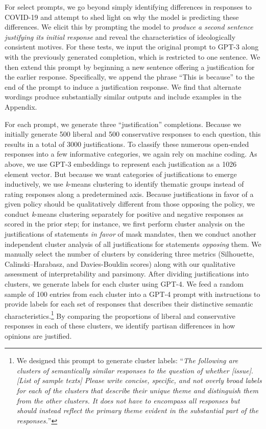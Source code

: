 \documentclass{article}
\begin{document}
For select prompts, we go beyond simply identifying differences in
responses to COVID-19 and attempt to shed light on why the model is
predicting these differences. We elicit this by prompting the model to
\emph{produce a second sentence justifying its initial response} and
reveal the characteristics of ideologically consistent motives. For
these tests, we input the original prompt to GPT-3 along with the
previously generated completion, which is restricted to one sentence. We
then extend this prompt by beginning a new sentence offering a
justification for the earlier response. Specifically, we append the
phrase ``This is because'' to the end of the prompt to induce a
justification response. We find that alternate wordings produce
substantially similar outputs and include examples in the Appendix.

For each prompt, we generate three ``justification'' completions.
Because we initially generate 500 liberal and 500 conservative responses
to each question, this results in a total of 3000 justifications. To
classify these numerous open-ended responses into a few informative
categories, we again rely on machine coding. As above, we use GPT-3
embeddings to represent each justification as a 1026 element vector. But
because we want categories of justifications to emerge inductively, we
use \emph{k}-means clustering to identify thematic groups instead of
rating responses along a predetermined axis. Because justifications in
favor of a given policy should be qualitatively different from those
opposing the policy, we conduct \emph{k}-means clustering separately for
positive and negative responses as scored in the prior step; for
instance, we first perform cluster analysis on the justifications of
statements \emph{in favor} of mask mandates, then we conduct another
independent cluster analysis of all justifications for statements
\emph{opposing} them. We manually select the number of clusters by
considering three metrics (Silhouette, Calinski--Harabasz, and
Davies-Bouldin scores) along with our qualitative assessment of
interpretability and parsimony. After dividing justifications into
clusters, we generate labels for each cluster using GPT-4. We feed a
random sample of 100 entries from each cluster into a GPT-4 prompt with
instructions to provide labels for each set of responses that describes
their distinctive semantic characteristics.\footnote{We designed this
  prompt to generate cluster labels: ``\emph{The following are clusters
  of semantically similar responses to the question of whether
  {[}issue{]}}. \emph{{[}List of sample texts{]} Please write concise,
  specific, and not overly broad labels for each of the clusters that
  describe their unique theme and distinguish them from the other
  clusters. It does not have to encompass all responses but should
  instead reflect the primary theme evident in the substantial part of
  the responses.}''} By comparing the proportions of liberal and
conservative responses in each of these clusters, we identify partisan
differences in how opinions are justified.
\end{document}
